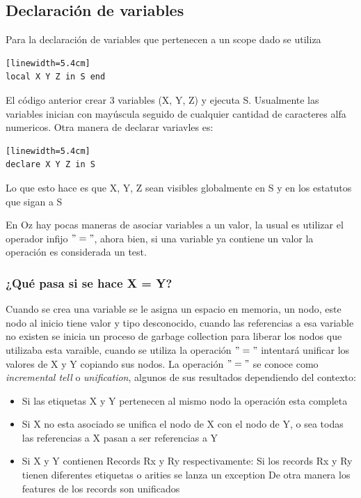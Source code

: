 \documentclass[10pt,journal,compsoc]{IEEEtran}
\begin{document}
\subsection{Declaraci\'on de variables}
Para la declaraci\'on de variables que pertenecen a un scope dado se utiliza
\begin{lstlisting}[language=Oz, caption = {Variables en un scope}][linewidth=5.4cm]
local X Y Z in S end
\end{lstlisting}
El c\'odigo anterior crear 3 variables (X, Y, Z) y ejecuta S. Usualmente las variables inician con may\'uscula seguido de cualquier cantidad de caracteres alfa numericos. Otra manera de declarar variavles es:
\begin{lstlisting}[language=Oz, caption = {Variables en un scope}][linewidth=5.4cm]
declare X Y Z in S
\end{lstlisting}
Lo que esto hace es que X, Y, Z sean visibles globalmente en S y en los estatutos que sigan a S
\par En Oz hay pocas maneras de asociar variables a un valor, la usual es utilizar el operador infijo $"="$, ahora bien, si una variable ya contiene un valor la operaci\'on es considerada un test.

\subsubsection{¿Qu\'e pasa si se hace X = Y?}
Cuando se crea una variable se le asigna un espacio en memoria, un nodo, este nodo al inicio tiene valor y tipo desconocido, cuando las referencias a esa variable no existen se inicia un proceso de garbage collection para liberar los nodos que utilizaba esta varaible, cuando se utiliza la operaci\'on $"="$ intentar\'a unificar los valores de X y Y copiando sus nodos. La operaci\'on $"="$ se conoce como \emph{incremental tell} o \emph{unification}, algunos de sus resultados dependiendo del contexto:
\begin{itemize}
	\item Si las etiquetas X y Y pertenecen al mismo nodo la operaci\'on esta completa
	\item Si X no esta asociado se unifica el nodo de X con el nodo de Y, o sea todas las referencias a X pasan a ser referencias a Y
	\item Si X y Y contienen Records Rx y Ry respectivamente:
		\subitem Si los records Rx y Ry tienen diferentes etiquetas o arities se lanza un exception
		\subitem De otra manera los features de los records son unificados
\end{itemize}
\end{document}
